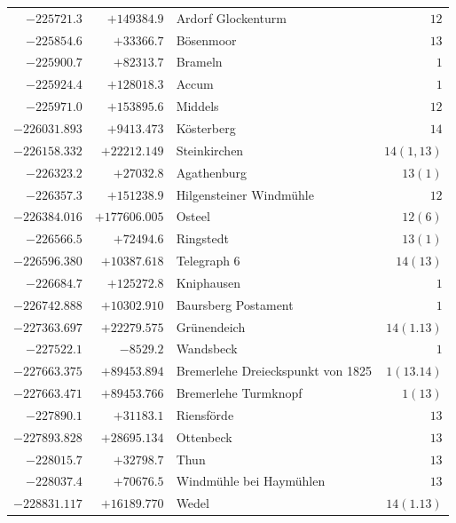 \begin{center}
\begin{tabular}{r|r|p{170pt}|r}
\(-225721.3\)&\(+149384.9\)&Ardorf Glockenturm&\(12\)\\
\(-225854.6\)&\(+33366.7\)&Bösenmoor&\(13\)\\
\(-225900.7\)&\(+82313.7\)&Brameln&\(1\)\\
\(-225924.4\)&\(+128018.3\)&Accum&\(1\)\\
\(-225971.0\)&\(+153895.6\)&Middels&\(12\)\\
\(-226031.893\)&\(+9413.473\)&Kösterberg&\(14\)\\
\(-226158.332\)&\(+22212.149\)&Steinkirchen&\(14(1,13)\)\\
\(-226323.2\)&\(+27032.8\)&Agathenburg&\(13(1)\)\\
\(-226357.3\)&\(+151238.9\)&Hilgensteiner Windmühle&\(12\)\\
\(-226384.016\)&\(+177606.005\)&Osteel&\(12(6)\)\\
\(-226566.5\)&\(+72494.6\)&Ringstedt&\(13(1)\)\\
\(-226596.380\)&\(+10387.618\)&Telegraph 6&\(14(13)\)\\
\(-226684.7\)&\(+125272.8\)&Kniphausen&\(1\)\\
\(-226742.888\)&\(+10302.910\)&Baursberg Postament&\(1\)\\
\(-227363.697\)&\(+22279.575\)&Grünendeich&\(14(1.13)\)\\
\(-227522.1\)&\(-8529.2\)&Wandsbeck&\(1\)\\
\(-227663.375\)&\(+89453.894\)&Bremerlehe Dreieckspunkt von 1825&\(1(13.14)\)\\
\(-227663.471\)&\(+89453.766\)&Bremerlehe Turmknopf&\(1(13)\)\\
\(-227890.1\)&\(+31183.1\)&Riensförde&\(13\)\\
\(-227893.828\)&\(+28695.134\)&Ottenbeck&\(13\)\\
\(-228015.7\)&\(+32798.7\)&Thun&\(13\)\\
\(-228037.4\)&\(+70676.5\)&Windmühle bei Haymühlen&\(13\)\\
\(-228831.117\)&\(+16189.770\)&Wedel&\(14(1.13)\)\\
\hline\end{tabular}\endgroup\end{center}
\clearpage
